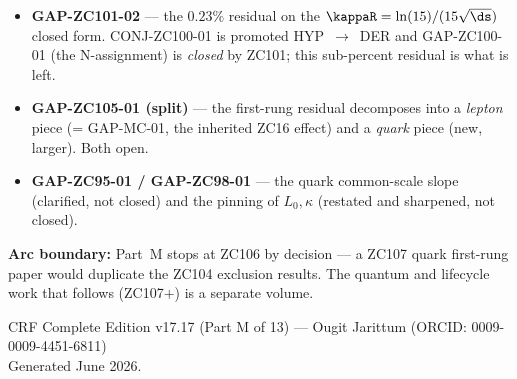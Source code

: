 \documentclass[12pt, a4paper]{article}
\begin{document}
\begin{openqbox}[title={What remains open when the arc stops at ZC106}]
\sloppy
\begin{itemize}[leftmargin=1.4em,itemsep=2pt]
\item \textbf{GAP-ZC101-02} --- the $0.23\%$ residual on the
$\kappaR=\ln(15)/(15\sqrt{\ds})$ closed form. CONJ-ZC100-01 is promoted
HYP~$\to$~DER and GAP-ZC100-01 (the N-assignment) is \emph{closed} by ZC101;
this sub-percent residual is what is left.
\item \textbf{GAP-ZC105-01 (split)} --- the first-rung residual decomposes
into a \emph{lepton} piece (= GAP-MC-01, the inherited ZC16 effect) and a
\emph{quark} piece (new, larger). Both open.
\item \textbf{GAP-ZC95-01 / GAP-ZC98-01} --- the quark common-scale slope
(clarified, not closed) and the pinning of $L_0,\kappa$ (restated and
sharpened, not closed).
\end{itemize}
\textbf{Arc boundary:} Part~M stops at ZC106 by decision --- a ZC107 quark
first-rung paper would duplicate the ZC104 exclusion results. The quantum
and lifecycle work that follows (ZC107$+$) is a separate volume.
\end{openqbox}

\vfill\begin{center}\small\color{mutedgray}
CRF Complete Edition v17.17 (Part M of 13) ---
Ougit Jarittum (ORCID: 0009-0009-4451-6811)\\Generated June 2026.
\end{center}
\end{document}
